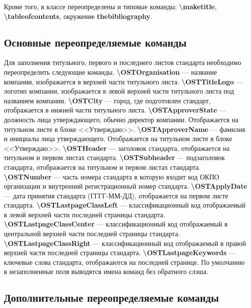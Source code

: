 \documentclass[12pt, twoside, final]{ruost}
\newcommand{\txtcmd}[1]{\textbf{\backslash{}#1}}
\begin{document}
\begin{OST}
				\point Кроме того, в классе переопределены и типовые команды: \txtcmd{maketitle}, \txtcmd{tableofcontents}, окружение \textbf{thebibliography}.
			
			\subsection{Основные переопределяемые команды}
			
				\point Для заполнения титульного, первого и последнего листов стандарта необходимо переопределить следующие команды.
					\subpoint \txtcmd{OSTOrganisation} --- название компании, изображается в верхней части титульного листа.
					\subpoint \txtcmd{OSTTitleLogo} --- логотип компании, изображается в левой верхней части титульного листа под названием компании.
					\subpoint \txtcmd{OSTCity} --- город, где подготовлен стандарт, отображается в нижней части титульного листа.
					\subpoint \txtcmd{OSTApproverState} --- должность лица утверждающего, обычно директор компании. Отображается на титульном листе в блоке <<Утверждаю>>.
					\subpoint \txtcmd{OSTApproverName} --- фамилия и инициалы лица утверждающего. Отображается на титульном листе в блоке <<Утверждаю>>.
					\subpoint \txtcmd{OSTHeader} --- заголовок стандарта, отображается на титульном и первом листах стандарта.
					\subpoint \txtcmd{OSTSubheader} --- подзаголовок стандарта, отображается на титульном и первом листах стандарта.
					\subpoint \txtcmd{OSTNumber} --- часть номера стандарта в которую входит код ОКПО организации и внутренний регистрационный номер стандарта.
					\subpoint \txtcmd{OSTApplyDate} --- дата принятия стандарта (ГГГГ-ММ-ДД), отображается на первом листе стандарта.
					\subpoint \txtcmd{OSTLastpageClassLeft} --- классификационный код отображаемый в левой верхней части последней страницы стандарта.
					\subpoint \txtcmd{OSTLastpageClassCenter} --- классификационный код отображаемый в центральной верхней части последней страницы стандарта.
					\subpoint \txtcmd{OSTLastpageClassRight} --- классификационный код отображаемый в правой верхней части последней страницы стандарта.
					\subpoint \txtcmd{OSTLastpageKeywords} --- ключевые слова стандарта, отображаются на последней странице.
				\point По умолчанию в незаполненные поля выводятся имена команд без обратного слэша.
			
			\subsection{Дополнительные переопределяемые команды}
			

\end{OST}
\end{document}
